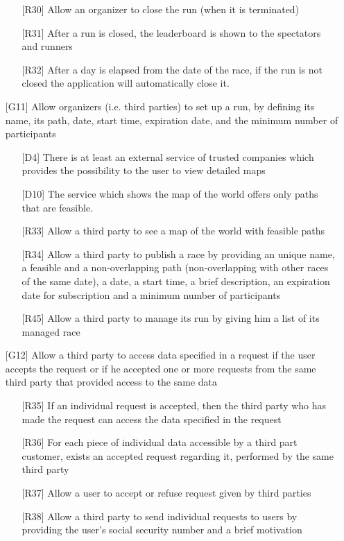 \begin{itemize}
\begin{itemize}
	\item[{[R30]}] Allow an organizer to close the run (when it is terminated)
	\item[{[R31]}] After a run is closed, the leaderboard is shown to the spectators and runners
	\item[{[R32]}] After a day is elapsed from the date of the race, if the run is not closed the application will automatically close it.
	\end{itemize}
\item[{[G11]}] Allow organizers (i.e. third parties) to set up a run, by defining its name, its path, date, start time, expiration date, and the minimum number of participants
	\begin{itemize}
	\item[{[D4]}] There is at least an external service of trusted companies which provides the possibility to the user to view detailed maps
	\item[{[D10]}] The service which shows the map of the world offers only paths that are feasible.
	\item[{[R33]}] Allow a third party to see a map of the world with feasible paths
	\item[{[R34]}] Allow a third party to publish a race by providing an unique name, a feasible and a non-overlapping path (non-overlapping with other races of the same date), a date, a start time, a brief description, an expiration date for subscription and a minimum number of participants
	\item[{[R45]}] Allow a third party to manage its run by giving him a list of its managed race
	\end{itemize}
\item[{[G12]}] Allow a third party to access data specified in a request if the user accepts the request or if he accepted one or more requests from the same third party that provided access to the same data 
	\begin{itemize}
	\item[{[R35]}] If an individual request is accepted, then the third party who has made the request can access the data specified in the request
	\item[{[R36]}] For each piece of individual data accessible by a third part customer, exists an accepted request regarding it, performed by the same third party 
	\item[{[R37]}] Allow a user to accept or refuse request given by third parties
	\item[{[R38]}] Allow a third party to send individual requests to users by providing the user's social security number and a brief motivation

\end{itemize}
\end{itemize}
